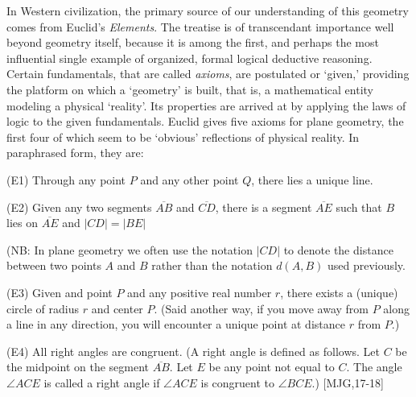 



In Western civilization, the primary source of our understanding of
this geometry comes from Euclid's \textit{Elements}. The treatise is
of transcendant importance well beyond geometry itself, because it is
among the first, and perhaps the most influential single example of
organized, formal logical deductive reasoning. Certain fundamentals,
that are called \textit{axioms}, are postulated or `given,' providing
the platform on which a `geometry' is built, that is, a mathematical
entity modeling a physical `reality'. Its properties are arrived at by
applying the laws of logic to the given fundamentals. Euclid gives
five axioms for plane geometry, the first four of which seem to be
`obvious' reflections of physical reality. In paraphrased form, they
are:

\begin{axiom}
(E1) Through any point $P$ and any other point $Q$, there lies a
unique line.
\end{axiom}

\begin{axiom}
(E2) Given any two segments $\overline{AB}$ and $\overline{CD}$, there
is a segment $\overline{AE}$ such that $B$ lies on $\overline{AE}$ and
$\left\vert CD\right\vert =\left\vert BE\right\vert $

(NB: In plane geometry we often use the notation $\left\vert
CD\right\vert $ to denote the distance between two points $A$ and $B$
rather than the notation $d\left( A,B\right) $ used previously.
\end{axiom}

\begin{axiom}
(E3) Given and point $P$ and any positive real number $r$, there
exists a (unique) circle of radius $r$ and center $P$. (Said another
way, if you move away from $P$ along a line in any direction, you will
encounter a unique point at distance $r$ from $P$.)
\end{axiom}

\begin{axiom}
(E4) All right angles are congruent. (A right angle is defined as
follows. Let $C$ be the midpoint on the segment $\overline{AB}$. Let
$E$ be any point not equal to $C$. The angle $\angle ACE$ is called a
right angle if $\angle ACE$ is congruent to $\angle BCE$.) [MJG,17-18]
\end{axiom}

